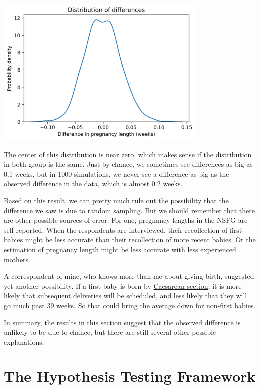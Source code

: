 \begin{center}
\includegraphics[width=4in]{chapters/13_hypothesis_files/13_hypothesis_66_0.png}
\end{center}

The center of this distribution is near zero, which makes sense if the
distribution in both group is the same. Just by chance, we sometimes see
differences as big as 0.1 weeks, but in 1000 simulations, we never see a
difference as big as the observed difference in the data, which is
almost 0.2 weeks.

Based on this result, we can pretty much rule out the possibility that
the difference we saw is due to random sampling. But we should remember
that there are other possible sources of error. For one, pregnancy
lengths in the NSFG are self-reported. When the respondents are
interviewed, their recollection of first babies might be less accurate
than their recollection of more recent babies. Or the estimation of
pregnancy length might be less accurate with less experienced mothers.

A correspondent of mine, who knows more than me about giving birth,
suggested yet another possibility. If a first baby is born by
\href{https://en.wikipedia.org/wiki/Caesarean_section}{Caesarean
section}, it is more likely that subsequent deliveries will be
scheduled, and less likely that they will go much past 39 weeks. So that
could bring the average down for non-first babies.

In summary, the results in this section suggest that the observed
difference is unlikely to be due to chance, but there are still several
other possible explanations.

\hypertarget{the-hypothesis-testing-framework}{%
\section{The Hypothesis Testing
Framework}\label{the-hypothesis-testing-framework}}

